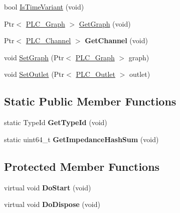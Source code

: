 \begin{DoxyCompactItemize}
\item 
bool \hyperlink{classns3_1_1PLC__Node_a07aa4b7127953ab3285c50d00ebd550d}{\-Is\-Time\-Variant} (void)
\item 
\-Ptr$<$ \hyperlink{classns3_1_1PLC__Graph}{\-P\-L\-C\-\_\-\-Graph} $>$ \hyperlink{classns3_1_1PLC__Node_aa4f801cb511cb5d99b5918ae47d74b18}{\-Get\-Graph} (void)
\item 
\hypertarget{classns3_1_1PLC__Node_a1af9782b5b1703cb60b149fde6ea5c53}{\-Ptr$<$ \hyperlink{classns3_1_1PLC__Channel}{\-P\-L\-C\-\_\-\-Channel} $>$ {\bfseries \-Get\-Channel} (void)}\label{classns3_1_1PLC__Node_a1af9782b5b1703cb60b149fde6ea5c53}

\item 
void \hyperlink{classns3_1_1PLC__Node_afd7f60aa8c6cb699b303fe3bba4035d2}{\-Set\-Graph} (\-Ptr$<$ \hyperlink{classns3_1_1PLC__Graph}{\-P\-L\-C\-\_\-\-Graph} $>$ graph)
\item 
void \hyperlink{classns3_1_1PLC__Node_abbd0e0d52256ff736e33a22c708f1111}{\-Set\-Outlet} (\-Ptr$<$ \hyperlink{classns3_1_1PLC__Outlet}{\-P\-L\-C\-\_\-\-Outlet} $>$ outlet)
\end{DoxyCompactItemize}
\subsection*{\-Static \-Public \-Member \-Functions}
\begin{DoxyCompactItemize}
\item 
\hypertarget{classns3_1_1PLC__Node_a5a51763811f8468bffb7d0f34e8eedd5}{static \-Type\-Id {\bfseries \-Get\-Type\-Id} (void)}\label{classns3_1_1PLC__Node_a5a51763811f8468bffb7d0f34e8eedd5}

\item 
\hypertarget{classns3_1_1PLC__Node_abea56a73f524e9817bc1847b5d9ba82d}{static uint64\-\_\-t {\bfseries \-Get\-Impedance\-Hash\-Sum} (void)}\label{classns3_1_1PLC__Node_abea56a73f524e9817bc1847b5d9ba82d}

\end{DoxyCompactItemize}
\subsection*{\-Protected \-Member \-Functions}
\begin{DoxyCompactItemize}
\item 
\hypertarget{classns3_1_1PLC__Node_a4a29e9bd60301a431ab162f2eb159961}{virtual void {\bfseries \-Do\-Start} (void)}\label{classns3_1_1PLC__Node_a4a29e9bd60301a431ab162f2eb159961}

\item 
\hypertarget{classns3_1_1PLC__Node_aba36f5bab59110d3f39c8fb34e956f23}{virtual void {\bfseries \-Do\-Dispose} (void)}\label{classns3_1_1PLC__Node_aba36f5bab59110d3f39c8fb34e956f23}

\end{DoxyCompactItemize}

